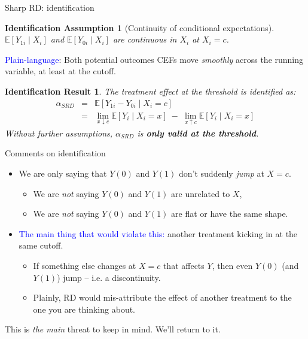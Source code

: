 \documentclass[xcolor=dvipsnames]{beamer}
\newcommand\E{\mathbb{E}}
\newtheorem{iass}{Identification Assumption}
\newtheorem{ires}{Identification Result}
\begin{document}
\begin{frame}{Sharp RD: identification}
\begin{iass}[Continuity of conditional expectations]
$\E[Y_{1i} \mid X_i]$ and $\E[Y_{0i} \mid X_i]$ are continuous in $X_i$ at $X_i = c$.
\end{iass}
\medskip
{} \textcolor{Blue}{Plain-language}: Both potential outcomes CEFs move \textit{smoothly} across the running variable, at least at the cutoff.
\medskip

\begin{ires}
The treatment effect at the threshold is identified as:
\begin{eqnarray*}
\alpha_{SRD} &=& \E[Y_{1i} - Y_{0i} \mid X_i = c] \\
 &=& \lim_{x \downarrow c} \E[Y_i \mid X_i = x] \;-\; \lim_{x \uparrow c} \E[Y_i \mid X_i = x]
\end{eqnarray*}
Without further assumptions, $\alpha_{SRD}$ is \textbf{only valid at the threshold}.
\end{ires}
\end{frame}


\begin{frame}{Comments on identification}
\small
\begin{itemize}
\item<1-> We are only saying that $Y(0)$ and $Y(1)$ don't suddenly \textit{jump} at $X=c$.
\medskip
\begin{itemize}
\item<2-> We are \textit{not} saying $Y(0)$ and $Y(1)$ are unrelated to $X$, 
\item<3-> We are \textit{not} saying $Y(0)$ and $Y(1)$ are flat or have the same shape.
\end{itemize}
\medskip
\item<4-> \textcolor{Blue}{The main thing that would violate this:} another treatment kicking in at the same cutoff.
\begin{itemize}
\footnotesize
  \item If something else changes at $X=c$ that affects $Y$, then even $Y(0)$ (and $Y(1)$) jump -- i.e. a discontinuity.
  \item Plainly, RD would mis-attribute the effect of another treatment to the one you are thinking about.
\end{itemize}
\medskip
\end{itemize}
\normalsize
\begin{center} 
   This is \textit{the main} threat to keep in mind. We'll return to it.
\end{center}
\end{frame}
\end{document}
